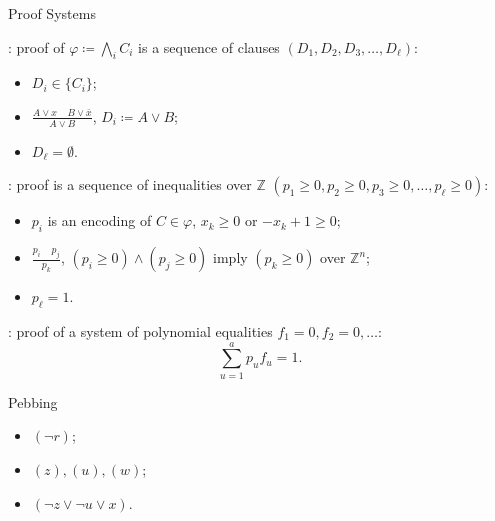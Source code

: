 \begin{frame}{Proof Systems}

    : proof of $\varphi \coloneqq \bigwedge\limits_{i} C_i$ is a sequence of clauses
    $(D_1, D_2, D_3, \dots, D_{\ell})$:
    \pause
    
    \begin{minipage}{0.3\linewidth}
        \begin{itemize}
            \item $D_i \in \{C_i\}$;
                \pause
            \item $\frac{A \lor x ~~~~~ B \lor \bar{x}}{A \lor B}$, $D_i \coloneqq A \lor B$;
                \pause
            \item $D_{\ell} = \emptyset$.
        \end{itemize}
    \end{minipage}
    \pause
    \begin{minipage}{0.68\linewidth}
        \centering
        
    \end{minipage}


    \pause
    \vspace{0.3cm}

    : proof is a sequence of inequalities over $\mathbb{Z}$
    $(p_1 \ge 0, p_2 \ge 0, p_3 \ge 0, \dots, p_{\ell} \ge 0)$:
    \begin{itemize}
        \item $p_i$ is an encoding of $C \in \varphi$, $x_k \ge 0$ or $-x_k + 1 \ge 0$;
        \item $\frac{p_i ~~~~~ p_j}{p_k}$,  $(p_i \ge 0) \land (p_j \ge 0)$ imply $(p_k \ge 0)$
            \alert{over $\mathbb{Z}^n$};
        \item $p_{\ell} = 1$.
    \end{itemize}

    \pause
    \vspace{0.3cm}

    : proof of a system of polynomial equalities $f_1 = 0, f_2 = 0, \dots$:
    $$
        \sum_{u = 1}^{a} p_u f_u = 1.
    $$
\end{frame}


\begin{frame}{Pebbing}

    \begin{center}
                
    \end{center}

    \pause
    \begin{itemize}
        \item $(\neg r)$;
            \pause
        \item $(z), (u), (w)$;
            \pause
        \item $(\neg z \lor \neg u \lor x)$.    
    \end{itemize}

    \pause
    
\end{frame}

